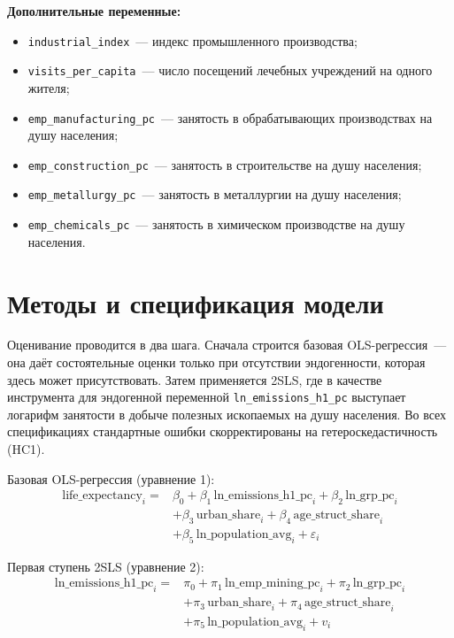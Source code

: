 \documentclass[11pt,a4paper]{article}
\begin{document}
\textbf{Дополнительные переменные:}
\begin{itemize}
  \item \texttt{industrial\_index}~--- индекс промышленного производства;
  \item \texttt{visits\_per\_capita}~--- число посещений лечебных учреждений на одного жителя;
  \item \texttt{emp\_manufacturing\_pc}~--- занятость в обрабатывающих производствах на душу населения;
  \item \texttt{emp\_construction\_pc}~--- занятость в строительстве на душу населения;
  \item \texttt{emp\_metallurgy\_pc}~--- занятость в металлургии на душу населения;
  \item \texttt{emp\_chemicals\_pc}~--- занятость в химическом производстве на душу населения.
\end{itemize}

\section*{Методы и спецификация модели}

Оценивание проводится в два шага. Сначала строится базовая OLS-регрессия~--- она даёт состоятельные оценки только при отсутствии эндогенности, которая здесь может присутствовать. Затем применяется 2SLS, где в качестве инструмента для эндогенной переменной \texttt{ln\_emissions\_h1\_pc} выступает логарифм занятости в добыче полезных ископаемых на душу населения. Во всех спецификациях стандартные ошибки скорректированы на гетероскедастичность (HC1).

Базовая OLS-регрессия (уравнение 1):
\begin{equation}
\label{eq:ols}
\begin{aligned}
\text{life\_expectancy}_i = {} & \beta_0 + \beta_1\,\text{ln\_emissions\_h1\_pc}_i + \beta_2\,\text{ln\_grp\_pc}_i \\
& + \beta_3\,\text{urban\_share}_i + \beta_4\,\text{age\_struct\_share}_i \\
& + \beta_5\,\text{ln\_population\_avg}_i + \varepsilon_i
\end{aligned}
\end{equation}

Первая ступень 2SLS (уравнение 2):
\begin{equation}
\label{eq:fs}
\begin{aligned}
\text{ln\_emissions\_h1\_pc}_i = {} & \pi_0 + \pi_1\,\text{ln\_emp\_mining\_pc}_i + \pi_2\,\text{ln\_grp\_pc}_i \\
& + \pi_3\,\text{urban\_share}_i + \pi_4\,\text{age\_struct\_share}_i \\
& + \pi_5\,\text{ln\_population\_avg}_i + v_i
\end{aligned}
\end{equation}
\end{document}
